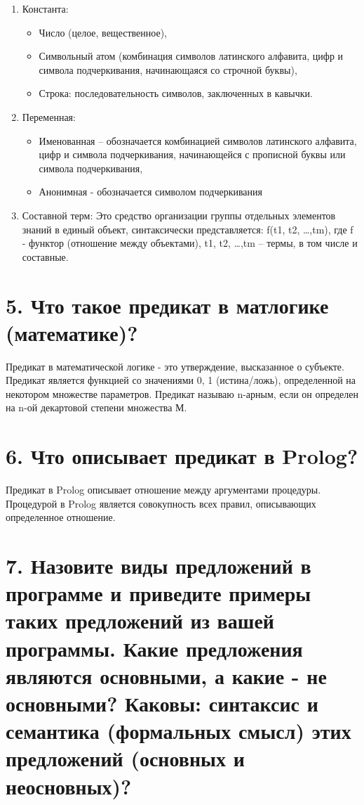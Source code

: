 \documentclass[12pt]{report}
\begin{document}
\begin{enumerate}
	\item Константа: 
	\begin{itemize}
		\item Число (целое, вещественное),
		\item Символьный атом (комбинация символов латинского алфавита, цифр и символа подчеркивания, начинающаяся со строчной буквы),
		\item Строка: последовательность символов, заключенных в кавычки.
	\end{itemize}
	\item Переменная:
	\begin{itemize}
		\item Именованная – обозначается комбинацией символов латинского алфавита, цифр и символа подчеркивания, начинающейся с прописной буквы или символа подчеркивания,
		\item Анонимная  - обозначается символом подчеркивания
	\end{itemize}
	\item Составной терм:
	Это средство организации группы отдельных элементов знаний в единый  объект,  синтаксически представляется: f(t1, t2, …,tm), где f -  функтор (отношение между объектами), t1, t2, …,tm – термы, в том  числе  и составные.
\end{enumerate}

\section*{5. Что такое предикат в матлогике (математике)?}

Предикат в математической логике - это утверждение, высказанное о субъекте. Предикат является функцией со значениями {0, 1} (истина/ложь), определенной на некотором множестве параметров. Предикат называю n-арным, если он определен на n-ой декартовой степени множества М.

\section*{6. Что описывает предикат в Prolog?}

Предикат в Prolog описывает отношение между аргументами процедуры. Процедурой в Prolog является совокупность всех правил, описывающих определенное отношение.

\section*{7. Назовите виды предложений в программе и приведите примеры таких предложений из вашей программы. Какие предложения являются основными, а какие - не основными? Каковы: синтаксис и семантика (формальных смысл) этих предложений (основных и неосновных)?}
\end{document}
